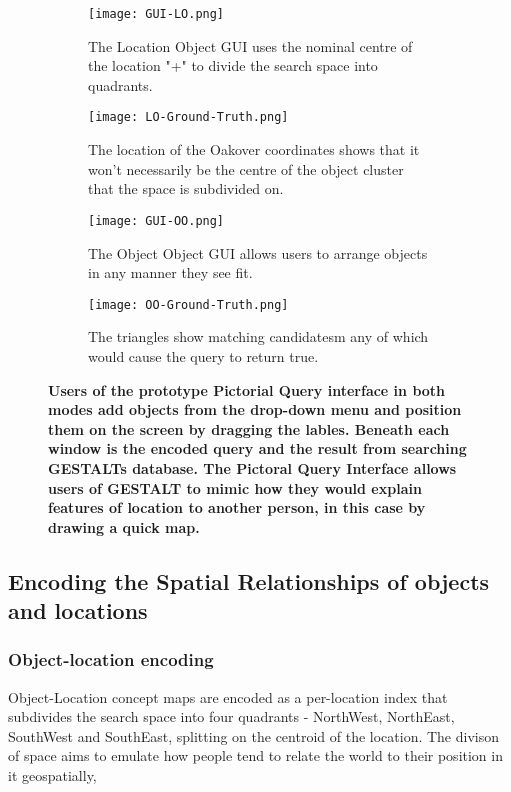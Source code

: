 \begin{figure*}[h]
    \centering
    \begin{subfigure}[t]{.2\textwidth} 
        \texttt{[image: GUI-LO.png]}
        \caption{\small The Location Object GUI uses the nominal centre of the location "+" to divide the search space into quadrants.}
        \label{fig:GUI-LO}
    \end{subfigure}
    \hfill
    \begin{subfigure}[t]{.2\textwidth} 
        \texttt{[image: LO-Ground-Truth.png]}
        \caption{\small The location of the Oakover coordinates shows that it won't necessarily be the centre of the object cluster that the space is subdivided on.}
        \label{fig:LO-Ground-Truth}
    \end{subfigure}
    \hfill
    \begin{subfigure}[t]{.2\textwidth}
        \texttt{[image: GUI-OO.png]}
        \caption{\small The Object Object GUI allows users to arrange objects in any manner they see fit.}
        \label{fig:GUI-OO}
    \end{subfigure}
    \hfill
    \begin{subfigure}[t]{.2\textwidth} 
        \texttt{[image: OO-Ground-Truth.png]}
        \caption{\small The triangles show matching candidatesm any of which would cause the query to return true.}
        \label{fig:OO-Ground-Truth}
    \end{subfigure}
    \hfill
    \caption{\textbf{Users of the prototype Pictorial Query interface in both modes add objects from the drop-down menu and position them on the screen by dragging the lables. Beneath each window is the encoded query and the result from searching GESTALTs database. The Pictoral Query Interface allows users of GESTALT to mimic how they would explain features of location to another person, in this case by drawing a quick map.}}\label{figure:GUI} 
\end{figure*}

\subsection{Encoding the Spatial Relationships of objects and locations}

\subsubsection{Object-location encoding}
Object-Location concept maps are encoded as a per-location index that subdivides the search space into four quadrants - NorthWest, NorthEast, SouthWest and SouthEast, splitting on the centroid of the location. The divison of space aims to emulate how people tend to relate the world to their position in it geospatially, 


